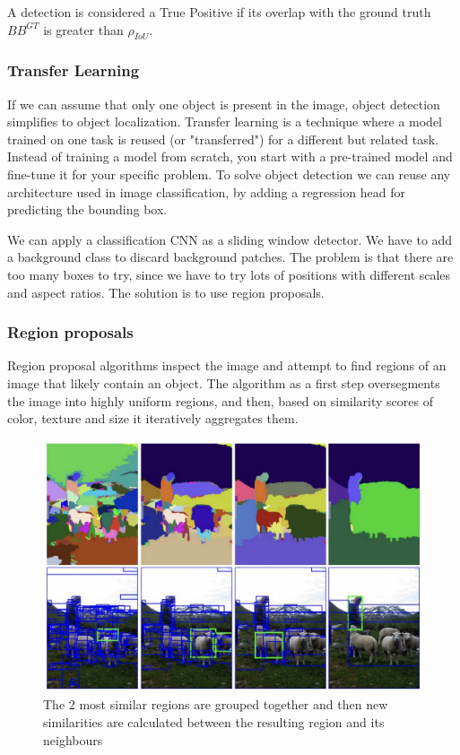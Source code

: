 A detection is considered a True Positive if its overlap with the ground truth $BB^{GT}$ is greater than $\rho_{IoU}$.

\subsubsection{Transfer Learning}
If we can assume that only one object is present in the image, object detection simplifies to object localization.
Transfer learning is a technique where a model trained on one task is reused (or "transferred") for a different but related task.
Instead of training a model from scratch, you start with a pre-trained model and fine-tune it for your specific problem.
To solve object detection we can reuse any architecture used in image classification, by adding a regression head for predicting the bounding box.

We can apply a classification CNN as a sliding window detector.
We have to add a background class to discard background patches.
The problem is that there are too many boxes to try, since we have to try lots of positions with different scales and aspect ratios.
The solution is to use region proposals.

\subsubsection{Region proposals}
Region proposal algorithms inspect the image and attempt to find regions of an image that likely contain an object.
The algorithm as a first step oversegments the image into highly uniform regions, and then, based on similarity scores of color, texture and size it iteratively aggregates them.

\begin{figure}[htbp]
  \centering
  \includegraphics[width=0.6\linewidth]{./img/region_proposal.jpg}
  \caption{The 2 most similar regions are grouped together and then new similarities are calculated between the resulting region and its neighbours}
\end{figure}

